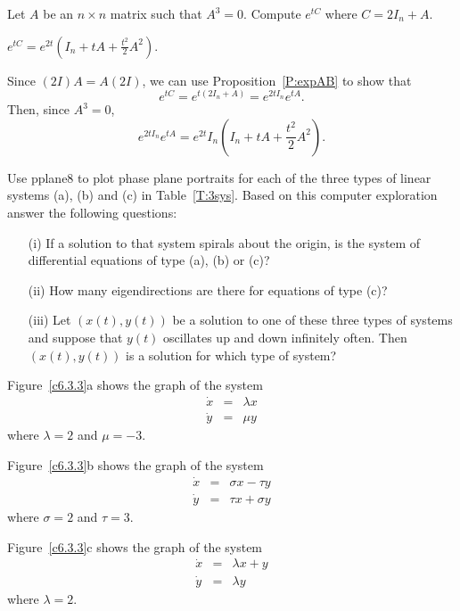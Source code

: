 \documentclass{ximera}
\begin{document}
\begin{exercise} \label{c6.3.25}
Let $A$ be an $n\times n$ matrix such that $A^3=0$.  Compute $e^{tC}$
where $C=2I_n+A$.

\begin{solution}

\ans $e^{tC} = e^{2t}(I_n + tA + \frac{t^2}{2}A^2)$.

\soln Since $(2I)A = A(2I)$, we can use Proposition~\ref{P:expAB} to
show that
\[
e^{tC} = e^{t(2I_n + A)} = e^{2tI_n}e^{tA}.
\]
Then, since $A^3 = 0$,
\[
e^{2tI_n}e^{tA} = e^{2t}I_n(I_n + tA + \frac{t^2}{2}A^2).
\]

\end{solution}
\end{exercise}

\CEXER

\begin{exercise} \label{c6.3.3}
Use {\sf pplane8} to plot phase plane portraits for each of the
three types of linear systems (a), (b) and (c) in Table~\ref{T:3sys}.
Based on this computer exploration answer the following questions:
\begin{itemize}
\item[(i)]  If a solution to that system spirals about the origin,
is the system of differential equations of type (a), (b) or (c)?
\item[(ii)]  How many eigendirections are there for equations of type (c)?
\item[(iii)]  Let $(x(t),y(t))$ be a solution to one of these three types of
systems and suppose that $y(t)$ oscillates up and down infinitely often.
Then $(x(t),y(t))$ is a solution for which type of system?
\end{itemize}

\begin{solution}

Figure~\ref{c6.3.3}a shows the graph of the system
\[ \begin{array}{rrr}
\dot{x} & = & \lambda x \\ 
\dot{y} & = & \mu y \end{array} \]
where $\lambda = 2$ and $\mu = -3$.

\para Figure~\ref{c6.3.3}b shows the graph of the system
\[ \begin{array}{rrr}
\dot{x} & = & \sigma x - \tau y \\
\dot{y} & = & \tau x + \sigma y \end{array} \]
where $\sigma = 2$ and $\tau = 3$.

\para Figure~\ref{c6.3.3}c shows the graph of the system
\[ \begin{array}{rrr}
\dot{x} & = & \lambda x + y \\
\dot{y} & = & \lambda y \end{array} \]
where $\lambda = 2$.


\end{solution}
\end{exercise}
\end{document}
